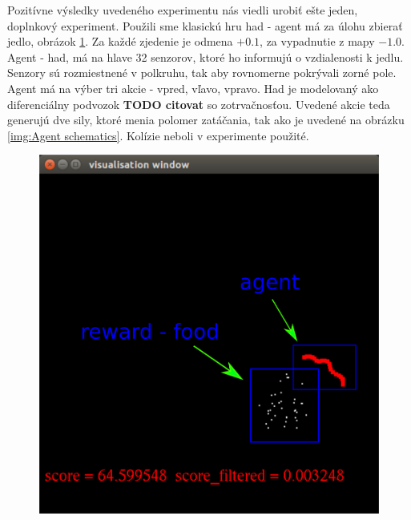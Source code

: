 \documentclass[10pt,a4paper]{article}
\begin{document}
Pozitívne výsledky uvedeného experimentu nás viedli urobiť ešte jeden, doplnkový experiment.
Použili sme klasickú hru had - agent má za úlohu zbierať jedlo, obrázok \ref{img:Testing snake game}.
Za každé zjedenie je odmena $+0.1$, za vypadnutie z mapy $-1.0$. Agent - had, má na
hlave 32 senzorov, ktoré ho informujú o vzdialenosti k jedlu. Senzory sú rozmiestnené
v polkruhu, tak aby rovnomerne pokrývali zorné pole.
Agent má na výber tri akcie - vpred, vľavo, vpravo. Had je modelovaný ako diferenciálny
podvozok {\bf TODO citovat} so zotrvačnosťou. Uvedené akcie teda generujú dve sily, ktoré
menia polomer zatáčania, tak ako je uvedené na obrázku \ref{img:Agent schematics}.
Kolízie neboli v experimente použité.



\begin{figure}[!htb]
\centering
\begin{minipage}{.5\textwidth}
  \centering
  \includegraphics[scale=0.3]{../../diagrams/worms_rl_game_desc.png}
  \label{img:Testing snake game}
\end{minipage}%
\begin{minipage}{.5\textwidth}
  \centering

\end{minipage}
\end{figure}
\end{document}
